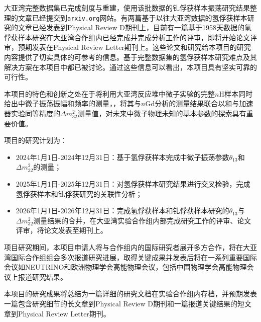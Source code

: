 \documentclass[a4paper,zihao=-4]{article}
\begin{document}
大亚湾完整数据集已完成刻度与重建，使用该批数据的钆俘获样本振荡研究结果整理的文章已经提交到\texttt{arxiv.org}网站。有两篇基于以往大亚湾数据的氢俘获样本研究的文章已经发表到Physical Review D期刊上，目前有一篇基于1958天数据的氢俘获样本研究在大亚湾合作组内已经完成并完成分析工作的评审，即将开始论文评审，预期发表在Physical Review Letter期刊上。这些论文和研究给本项目的研究内容提供了切实具体的可参考的信息。基于完整数据集的氢俘获样本研究难点及其解决方案在本项目中都已被讨论。通过这些信息可以看出，本项目具有坚实可靠的可行性。


本项目的特色和创新之处在于将利用大亚湾反应堆中微子实验的完整$n$H样本同时给出中微子振荡振幅和频率的测量，，将其与$n$Gd分析的测量结果联合以和与加速器实验同等精度的$\Delta m_{32}^2$测量值，对未来中微子物理未知的基本参数的探索具有重要价值。


项目的研究计划为：
\begin{itemize}
	\item 2024年1月1日-2024年12月31日：基于氢俘获样本完成中微子振荡参数$\theta_{13}$和$\Delta m_{32}^2$的测量；
	\item 2025年1月1日-2025年12月31日：对氢俘获样本研究结果进行交叉检验，完成氢俘获样本和钆俘获研究的关联性分析；
	\item 2026年1月1日-2026年12月31日：完成氢俘获样本和钆俘获样本研究的$\theta_{13}$与$\Delta m_{32}^2$测量结果的合并，在大亚湾实验合作组内部完成研究工作的评审、论文评审，将论文发表至期刊上。
\end{itemize}

项目研究期间，本项目申请人将与合作组内的国际研究者展开多方合作，将在大亚湾国际合作组组会多次报道研究进展，取得关键成果并发表后将在一系列重要国际会议如NEUTRINO和欧洲物理学会高能物理会议，包括中国物理学会高能物理会议上报道研究结果。

本项目的研究成果将总结为一篇详细的研究文档在实验合作组内存档，并预期发表一篇包含研究细节的长文章到Physical Review D期刊和一篇报道关键结果的短文章到Physical Review Letter期刊。
\end{document}
